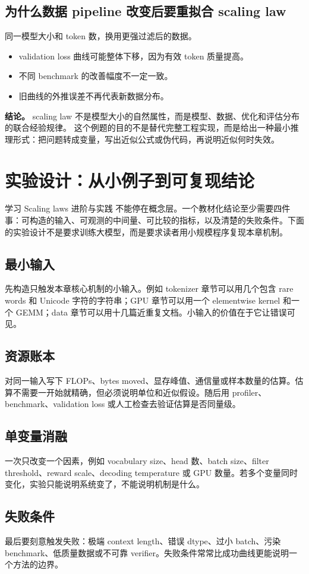 \documentclass[a4paper]{article}
\begin{document}
\subsection{为什么数据 pipeline 改变后要重拟合 scaling law}
同一模型大小和 token 数，换用更强过滤后的数据。
\begin{itemize}
\item validation loss 曲线可能整体下移，因为有效 token 质量提高。
\item 不同 benchmark 的改善幅度不一定一致。
\item 旧曲线的外推误差不再代表新数据分布。
\end{itemize}
\textbf{结论。} scaling law 不是模型大小的自然属性，而是模型、数据、优化和评估分布的联合经验规律。
这个例题的目的不是替代完整工程实现，而是给出一种最小推理形式：把问题转成变量，写出近似公式或伪代码，再说明近似何时失效。
\section{实验设计：从小例子到可复现结论}
学习 Scaling laws 进阶与实践 不能停在概念层。一个教材化结论至少需要四件事：可构造的输入、可观测的中间量、可比较的指标，以及清楚的失败条件。下面的实验设计不是要求训练大模型，而是要求读者用小规模程序复现本章机制。
\subsection{最小输入}
先构造只触发本章核心机制的小输入。例如 tokenizer 章节可以用几个包含 rare words 和 Unicode 字符的字符串；GPU 章节可以用一个 elementwise kernel 和一个 GEMM；data 章节可以用十几篇近重复文档。小输入的价值在于它让错误可见。
\subsection{资源账本}
对同一输入写下 FLOPs、bytes moved、显存峰值、通信量或样本数量的估算。估算不需要一开始就精确，但必须说明单位和近似假设。随后用 profiler、benchmark、validation loss 或人工检查去验证估算是否同量级。
\subsection{单变量消融}
一次只改变一个因素，例如 vocabulary size、head 数、batch size、filter threshold、reward scale、decoding temperature 或 GPU 数量。若多个变量同时变化，实验只能说明系统变了，不能说明机制是什么。
\subsection{失败条件}
最后要刻意触发失败：极端 context length、错误 dtype、过小 batch、污染 benchmark、低质量数据或不可靠 verifier。失败条件常常比成功曲线更能说明一个方法的边界。
\end{document}
